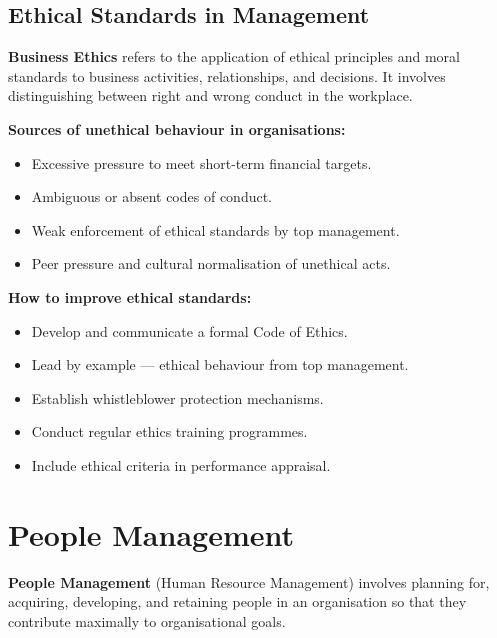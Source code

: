 \documentclass[12pt,a4paper]{article}
\begin{document}
\subsection{Ethical Standards in Management}

\begin{tcolorbox}[defbox, title={\textbf{Business Ethics}}]
\textbf{Business Ethics} refers to the application of ethical principles and moral standards to business activities, relationships, and decisions. It involves distinguishing between right and wrong conduct in the workplace.
\end{tcolorbox}

\textbf{Sources of unethical behaviour in organisations:}
\begin{itemize}[leftmargin=*, itemsep=2pt]
  \item Excessive pressure to meet short-term financial targets.
  \item Ambiguous or absent codes of conduct.
  \item Weak enforcement of ethical standards by top management.
  \item Peer pressure and cultural normalisation of unethical acts.
\end{itemize}

\textbf{How to improve ethical standards:}
\begin{itemize}[leftmargin=*, itemsep=2pt]
  \item Develop and communicate a formal Code of Ethics.
  \item Lead by example --- ethical behaviour from top management.
  \item Establish whistleblower protection mechanisms.
  \item Conduct regular ethics training programmes.
  \item Include ethical criteria in performance appraisal.
\end{itemize}

\section{People Management}

\begin{tcolorbox}[defbox, title={\textbf{People Management --- Overview}}]
\textbf{People Management} (Human Resource Management) involves planning for, acquiring, developing, and retaining people in an organisation so that they contribute maximally to organisational goals.
\end{tcolorbox}
\end{document}
